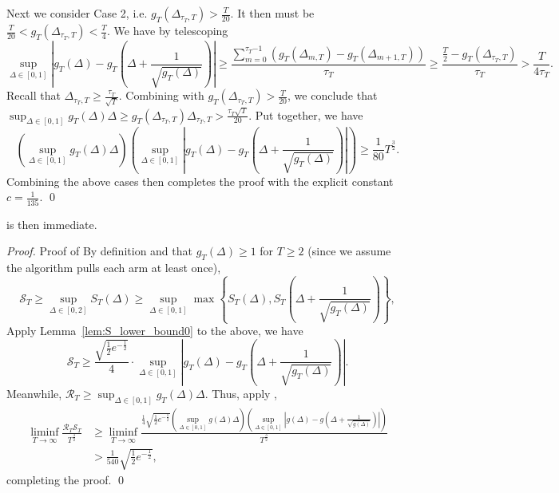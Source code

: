\documentclass[nonblindrev]{informs3_noinforms}
\begin{document}
Next we consider Case 2, i.e. $g_T(\Delta_{\tau_{T}, T}) > \frac{T}{20}$. It then must be $\frac{T}{20} < g_T(\Delta_{\tau_{T}, T}) < \frac{T}{4}.$ We have by telescoping 
\[
\sup_{\Delta\in[0, 1]}\left|g_T(\Delta)-g_T\left(\Delta+\frac{1}{\sqrt{g_T(\Delta)}}\right)\right| \ge \frac{\sum_{m = 0}^{\tau_T{-1}} \left(g_T(\Delta_{m, T}) - g_T(\Delta_{m+1, T})\right)}{\tau_T} \ge \frac{\frac{T}{2} - g_T(\Delta_{\tau_T, T})}{\tau_T} > \frac{T}{4 \tau_T}.
\]
Recall that $\Delta_{\tau_T, T} \ge \frac{\tau_T}{\sqrt{T}}$. Combining with $g_T(\Delta_{\tau_{T}, T}) > \frac{T}{{20}}$, we conclude that  $\sup_{\Delta\in[0, 1]}g_T(\Delta)\Delta \ge g_T(\Delta_{\tau_{T}, T})\Delta_{\tau_T, T}  > \frac{\tau_T \sqrt{T}}{20}.$ Put together, we have
\[
\left(\sup_{\Delta\in[0, 1]}g_T(\Delta)\Delta\right)\left(\sup_{\Delta\in[0, 1]}\left|g_T(\Delta)-g_T\left(\Delta+\frac{1}{\sqrt{g_T(\Delta)}}\right)\right|\right) \ge \frac{1}{80} T^{\frac{3}{2}}.
\]
Combining the above cases then completes the proof with the explicit constant $c = \frac{1}{135}.$ \qed
\endproof


 is then immediate.
\begin{proof}{Proof of }
By definition and that $g_T(\Delta) \ge 1$ for $T \ge 2$ (since we assume the algorithm pulls each arm at least once),
\[
\mathcal{S}_T \geq \sup_{\Delta \in [0, 2]} S_T(\Delta) \ge \sup_{\Delta\in[0,1]}\max\left\{S_T(\Delta), S_T\left(\Delta + \frac{1}{\sqrt{g_T(\Delta)}}\right)\right\},
\]
Apply Lemma~\ref{lem:S_lower_bound0} to the above, we have
\[
\mathcal{S}_T \ge \frac{\sqrt{\frac{1}{2}e^{-\frac{1}{2}}}}{4}\cdot\sup_{\Delta \in[0, 1]}\left|g_T(\Delta)-g_T\left(\Delta+\frac{1}{\sqrt{g_T(\Delta)}}\right)\right|.
\]
Meanwhile, $\mathcal{R}_T \ge \sup_{\Delta \in[0, 1]}g_T(\Delta)\Delta$. Thus, apply ,
    \begin{align*}
        \liminf_{T\rightarrow\infty}\frac{\mathcal R_T\mathcal S_T}{T^{\frac{3}{2}}}&\geq\liminf_{T\rightarrow\infty}\frac{\frac{1}{4}\sqrt{\frac{1}{2}e^{-\frac{1}{2}}}\left(\sup_{\Delta\in[0, 1]}g(\Delta)\Delta\right)\left(\sup_{\Delta\in[0, 1]}\left|g(\Delta)-g\left(\Delta+\frac{1}{\sqrt{g(\Delta)}}\right)\right|\right)}{T^{\frac{3}{2}}}\\
        &>\frac{1}{540}\sqrt{\frac{1}{2}e^{-\frac{1}{2}}},
    \end{align*}
    completing the proof. \qed
\end{proof}
\end{document}
